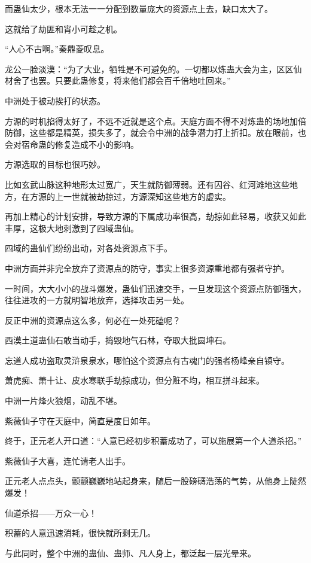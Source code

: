 \begin{this_body}
而蛊仙太少，根本无法一一分配到数量庞大的资源点上去，缺口太大了。

这就给了劫匪和宵小可趁之机。

“人心不古啊。”秦鼎菱叹息。

龙公一脸淡漠：“为了大业，牺牲是不可避免的。一切都以炼蛊大会为主，区区仙材舍了也罢。只要此蛊修复，将来他们都会百千倍地吐回来。”

中洲处于被动挨打的状态。

方源的时机掐得太好了，不远不近就是这个点。天庭方面不得不对炼蛊的场地加倍防御，这些都是精英，损失多了，就会令中洲的战争潜力打上折扣。放在眼前，也会对宿命蛊的修复造成不小的影响。

方源选取的目标也很巧妙。

比如玄武山脉这种地形太过宽广，天生就防御薄弱。还有囚谷、红河滩地这些地方，在方源的上一世就被劫掠过，方源深知这些地方的虚实。

再加上精心的计划安排，导致方源的下属成功率很高，劫掠如此轻易，收获又如此丰厚，这极大地刺激到了四域蛊仙。

四域的蛊仙们纷纷出动，对各处资源点下手。

中洲方面并非完全放弃了资源点的防守，事实上很多资源重地都有强者守护。

一时间，大大小小的战斗爆发，蛊仙们迅速交手，一旦发现这个资源点防御强大，往往进攻的一方就明智地放弃，选择攻击另一处。

反正中洲的资源点这么多，何必在一处死磕呢？

西漠土道蛊仙石敢当动手，捣毁地气石林，夺取大批圆坤石。

忘道人成功盗取灵浒泉泉水，哪怕这个资源点有古魂门的强者杨峰亲自镇守。

萧虎痴、萧十让、皮水寒联手劫掠成功，但分赃不均，相互拼斗起来。

中洲一片烽火狼烟，动乱不堪。

紫薇仙子守在天庭中，简直是度日如年。

终于，正元老人开口道：“人意已经初步积蓄成功了，可以施展第一个人道杀招。”

紫薇仙子大喜，连忙请老人出手。

正元老人点点头，颤颤巍巍地站起身来，随后一股磅礴浩荡的气势，从他身上陡然爆发！

仙道杀招——万众一心！

积蓄的人意迅速消耗，很快就所剩无几。

与此同时，整个中洲的蛊仙、蛊师、凡人身上，都泛起一层光晕来。


\end{this_body}
